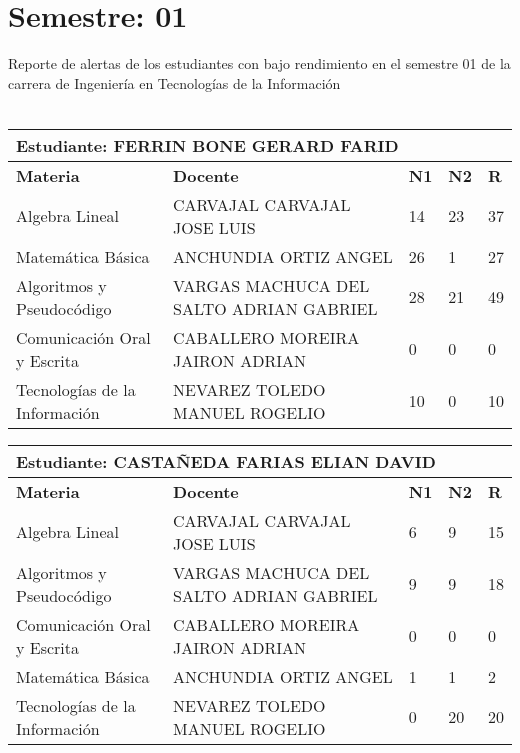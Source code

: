 \section{Semestre: 01}
        Reporte de alertas de los estudiantes con bajo rendimiento en el semestre 01 de la carrera de 
        Ingeniería en Tecnologías de la Información\\\\\small
\begin{tabularx}{\textwidth}{|p{5cm}|p{7cm}|X|X|X|}
\hline
\multicolumn{5}{|p{\dimexpr\textwidth-2\tabcolsep-2\arrayrulewidth}|}{\textbf{Estudiante: FERRIN BONE GERARD FARID }}\\\hline
\textbf{Materia} & \textbf{Docente} & \textbf{N1} & \textbf{N2} & \textbf{R} \\ \hline
Algebra Lineal & CARVAJAL CARVAJAL JOSE LUIS  & 14 & 23& 37 \\ \hline
Matemática Básica & ANCHUNDIA ORTIZ ANGEL   & 26 & 1& 27 \\ \hline
Algoritmos y Pseudocódigo & VARGAS MACHUCA DEL SALTO ADRIAN GABRIEL  & 28 & 21& 49 \\ \hline
Comunicación Oral y Escrita & CABALLERO MOREIRA JAIRON ADRIAN  & 0 & 0& 0 \\ \hline
Tecnologías de la Información  & NEVAREZ TOLEDO MANUEL ROGELIO  & 10 & 0& 10 \\ \hline
\end{tabularx}\vspace{10mm}
\small
\begin{tabularx}{\textwidth}{|p{5cm}|p{7cm}|X|X|X|}
\hline
\multicolumn{5}{|p{\dimexpr\textwidth-2\tabcolsep-2\arrayrulewidth}|}{\textbf{Estudiante: CASTAÑEDA FARIAS ELIAN DAVID }}\\\hline
\textbf{Materia} & \textbf{Docente} & \textbf{N1} & \textbf{N2} & \textbf{R} \\ \hline
Algebra Lineal & CARVAJAL CARVAJAL JOSE LUIS  & 6 & 9& 15 \\ \hline
Algoritmos y Pseudocódigo & VARGAS MACHUCA DEL SALTO ADRIAN GABRIEL  & 9 & 9& 18 \\ \hline
Comunicación Oral y Escrita & CABALLERO MOREIRA JAIRON ADRIAN  & 0 & 0& 0 \\ \hline
Matemática Básica & ANCHUNDIA ORTIZ ANGEL   & 1 & 1& 2 \\ \hline
Tecnologías de la Información  & NEVAREZ TOLEDO MANUEL ROGELIO  & 0 & 20& 20 \\ \hline
\end{tabularx}\vspace{10mm}
